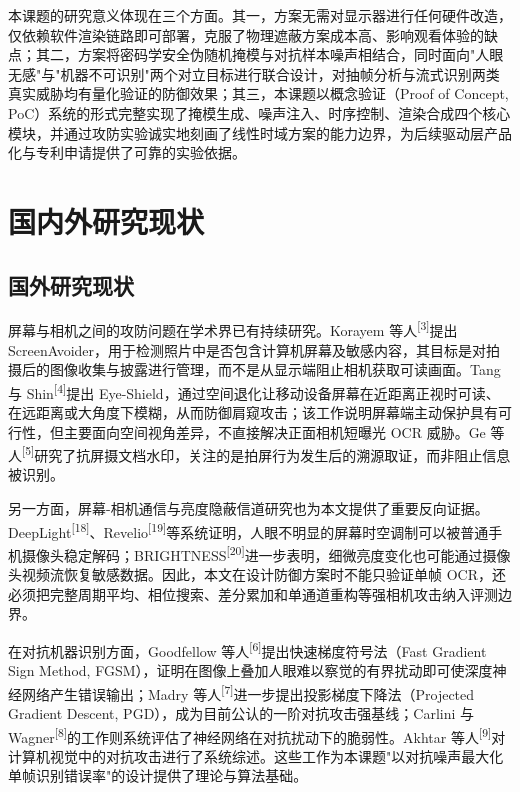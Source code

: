 本课题的研究意义体现在三个方面。其一，方案无需对显示器进行任何硬件改造，仅依赖软件渲染链路即可部署，克服了物理遮蔽方案成本高、影响观看体验的缺点；其二，方案将密码学安全伪随机掩模与对抗样本噪声相结合，同时面向"人眼无感"与"机器不可识别"两个对立目标进行联合设计，对抽帧分析与流式识别两类真实威胁均有量化验证的防御效果；其三，本课题以概念验证（Proof of Concept, PoC）系统的形式完整实现了掩模生成、噪声注入、时序控制、渲染合成四个核心模块，并通过攻防实验诚实地刻画了线性时域方案的能力边界，为后续驱动层产品化与专利申请提供了可靠的实验依据。

\section{国内外研究现状}

\subsection{国外研究现状}

屏幕与相机之间的攻防问题在学术界已有持续研究。Korayem 等人\textsuperscript{[3]}提出 ScreenAvoider，用于检测照片中是否包含计算机屏幕及敏感内容，其目标是对拍摄后的图像收集与披露进行管理，而不是从显示端阻止相机获取可读画面。Tang 与 Shin\textsuperscript{[4]}提出 Eye-Shield，通过空间退化让移动设备屏幕在近距离正视时可读、在远距离或大角度下模糊，从而防御肩窥攻击；该工作说明屏幕端主动保护具有可行性，但主要面向空间视角差异，不直接解决正面相机短曝光 OCR 威胁。Ge 等人\textsuperscript{[5]}研究了抗屏摄文档水印，关注的是拍屏行为发生后的溯源取证，而非阻止信息被识别。

另一方面，屏幕-相机通信与亮度隐蔽信道研究也为本文提供了重要反向证据。DeepLight\textsuperscript{[18]}、Revelio\textsuperscript{[19]}等系统证明，人眼不明显的屏幕时空调制可以被普通手机摄像头稳定解码；BRIGHTNESS\textsuperscript{[20]}进一步表明，细微亮度变化也可能通过摄像头视频流恢复敏感数据。因此，本文在设计防御方案时不能只验证单帧 OCR，还必须把完整周期平均、相位搜索、差分累加和单通道重构等强相机攻击纳入评测边界。

在对抗机器识别方面，Goodfellow 等人\textsuperscript{[6]}提出快速梯度符号法（Fast Gradient Sign Method, FGSM），证明在图像上叠加人眼难以察觉的有界扰动即可使深度神经网络产生错误输出；Madry 等人\textsuperscript{[7]}进一步提出投影梯度下降法（Projected Gradient Descent, PGD），成为目前公认的一阶对抗攻击强基线；Carlini 与 Wagner\textsuperscript{[8]}的工作则系统评估了神经网络在对抗扰动下的脆弱性。Akhtar 等人\textsuperscript{[9]}对计算机视觉中的对抗攻击进行了系统综述。这些工作为本课题"以对抗噪声最大化单帧识别错误率"的设计提供了理论与算法基础。

